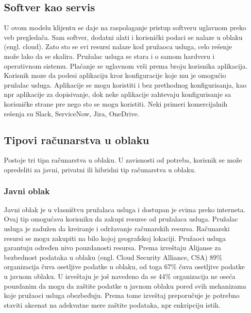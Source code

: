 \documentclass[12pt,oneside]{memoir}
\begin{document}
\subsection{Softver kao servis}
U ovom modelu klijentu se daje na raspolaganje pristup softveru uglavnom preko veb pregledača. Sam softver, dodatni alati i korisnički podaci se nalaze u oblaku (engl. cloud). Zato sto se svi resursi nalaze kod pružaoca usluga, celo rešenje može lako da se skalira. Pružalac usluga se stara i o samom hardveru i operativnom sistemu. Plaćanje se uglavnom vrši prema broju korisnika aplikacija. Korisnik moze da podesi aplikaciju kroz konfiguracije koje mu je omogućio pružalac usluga. Aplikacije se mogu koristiti i bez prethodnog konfigurisanja, kao npr aplikacije za dopisivanje, dok neke aplikacije zahtevaju konfigurisanje sa korisničke strane pre nego sto se mogu koristiti. Neki primeri komercijalnih rešenja su Slack, ServiceNow, Jira, OneDrive. %


\subsection{Tipovi računarstva u oblaku} %
 
Postoje tri tipa računarstva u oblaku. U zavisnosti od potreba, korisnik se može opredeliti za javni, privatni ili hibridni tip računarstva u oblaku.


\subsubsection{Javni oblak} %
Javni oblak je u vlasništvu pružalaca usluga i dostupan je svima preko interneta. Ovaj tip omogućava korisniku da zakupi resurse od pružalaca usluga. Pružalac usluga je zadužen da kreiranje i održavanje računarskih resursa. Računarski resursi se mogu zakupiti na bilo kojoj geografskoj lokaciji. Pružaoci usluga garantuju određen nivo pouzdanosti resursa. Prema izveštaju Alijanse za bezbednost podataka u oblaku (engl. Cloud Security Alliance, CSA) 89\% organizacija čuva osetljive podatke u oblaku, od toga 67\% čuva osetljive podatke u javnom oblaku. U izveštaju je još navedeno da se 44\% organizacija ne oseća pouzdanim da mogu da zaštite podatke u javnom oblaku pored svih mehanizama koje pružaoci usluga obezbeđuju. Prema tome izveštaj preporučuje je potrebno staviti akcenat na adekvatne mere zaštite podataka, npr enkripciju istih\cite{csa}.
\end{document}
